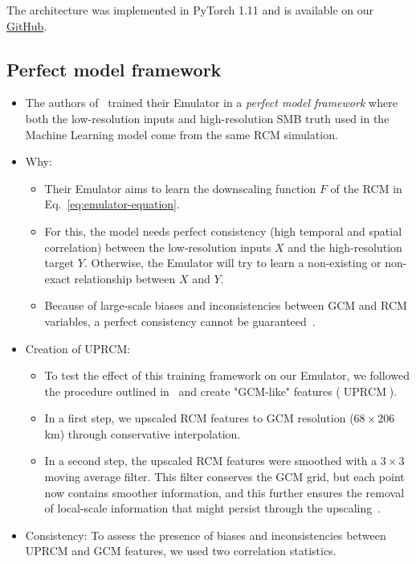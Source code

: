 \documentclass[a4paper,11pt,oneside]{report}
\begin{document}
The architecture was implemented in PyTorch 1.11 and is available on our \href{https://github.com/marvande/master-thesis}{GitHub}. 

\subsection{Perfect model framework}\label{subsec:perfect-model}
\begin{itemize}
    \item The authors of~\cite{Kittel} trained their Emulator in a \textit{perfect model framework} where both the low-resolution inputs and high-resolution SMB truth used in the Machine Learning model come from the same RCM simulation. 
    \item Why:
    \begin{itemize}
        \item Their Emulator aims to learn the downscaling function $F$ of the RCM in Eq.~\ref{eq:emulator-equation}.
        \item For this, the model needs perfect consistency (high temporal and spatial correlation) between the low-resolution inputs $X$ and the high-resolution target $Y$. Otherwise, the Emulator will try to learn a non-existing or non-exact relationship between $X$ and $Y$.
        \item Because of large-scale biases and inconsistencies between GCM and RCM variables, a perfect consistency cannot be guaranteed~\cite{Doury, Sanchez2009, Sanchez2018}.
    \end{itemize}
    \item Creation of UPRCM: 
    \begin{itemize}
        \item To test the effect of this training framework on our Emulator, we followed the procedure outlined in~\cite{Doury} and create "GCM-like" features ($\operatorname{UPRCM}$).
        \item In a first step, we upscaled RCM features to GCM resolution ($68\times206$ km) through conservative interpolation. 
        \item In a second step, the upscaled RCM features were smoothed with a $3\times3$ moving average filter. This filter conserves the GCM grid, but each point now contains smoother information, and this further ensures the removal of local-scale information that might persist through the upscaling~\cite{Doury, Klaver2020}.
    \end{itemize}
    \item Consistency: To assess the presence of biases and inconsistencies between UPRCM and GCM features, we used two correlation statistics.  

\end{itemize}
\end{document}
